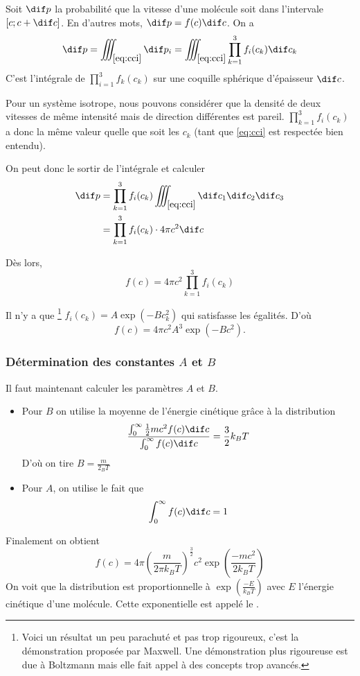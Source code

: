Soit $\dif p$ la probabilité que la vitesse d'une molécule soit
dans l'intervale $[c; c + \dif c]$.
En d'autres mots, $\dif p = f(c) \dif c$.
On a
\[ \dif p
= \iiint_{\eqref{eq:cci}} \dif p_i
= \iiint_{\eqref{eq:cci}} \prod_{k=1}^3 f_i(c_k) \dif c_k \]
C'est l'intégrale de $\prod_{i=1}^3 f_k(c_k)$ sur une coquille sphérique
d'épaisseur $\dif c$.

Pour un système isotrope, nous pouvons considérer que
la densité de deux vitesses de même intensité mais de direction
différentes est pareil.
$\prod_{k=1}^3 f_i(c_k)$ a donc la même valeur
quelle que soit les $c_k$ (tant que \eqref{eq:cci} est respectée bien entendu).

On peut donc le sortir de l'intégrale et calculer
\begin{align*}
  \dif p & = \prod_{k=1}^3 f_i(c_k)
  \iiint_{\eqref{eq:cci}} \dif c_1 \dif c_2 \dif c_3\\
  & = \prod_{k=1}^3 f_i(c_k) \cdot 4\pi c^2 \dif c
\end{align*}

Dès lors,
\[ f(c) = 4\pi c^2 \prod_{k=1}^3 f_i(c_k) \]

Il n'y a que
\footnote{Voici un résultat un peu parachuté et pas trop rigoureux,
c'est la démonstration proposée par Maxwell.
Une démonstration plus rigoureuse est due à Boltzmann
mais elle fait appel à des concepts trop avancés.}
$f_i(c_k) = A \exp(-Bc_k^2)$ qui satisfasse les égalités. D'où
\[ f(c) = 4\pi c^2 A^3 \exp (-Bc^2). \]


\subsubsection{Détermination des constantes $A$ et $B$}
Il faut maintenant calculer les paramètres $A$ et $B$.
\begin{itemize}
  \item Pour $B$ on utilise la moyenne de
    l'énergie cinétique grâce à la distribution
    \[ \frac{\int_0^{\infty}\frac 12 mc^2f(c)\dif c}
      {\int^{\infty}_0 f(c) \dif c}
    = \frac 32k_BT \]
    D'où on tire $B = \frac m{2_BT}$
  \item Pour $A$, on utilise le fait que
    \[ \int_0^{\infty} f(c) \dif c = 1 \]
\end{itemize}
Finalement on obtient
\[ f(c) = 4\pi \left(\frac{m}{2\pi k_BT}\right)^\frac 32
c^2 \exp\left(\frac{-mc^2}{2k_BT}\right) \]
On voit que la distribution est proportionnelle à
$\exp \left(\frac{-E}{k_BT}\right)$ avec $E$ l'énergie cinétique d'une molécule.
Cette exponentielle est appelé le .

